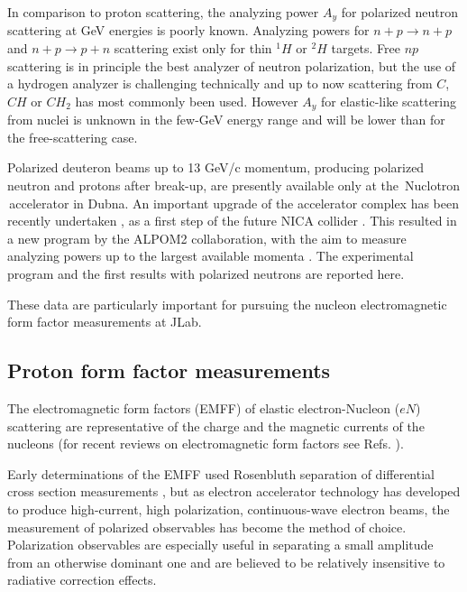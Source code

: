 \documentclass[twocolumn,epjc3]{svjour3}
\begin{document}
In comparison to proton scattering, the analyzing power $A_{y}$ for polarized neutron scattering at GeV energies is poorly known. Analyzing powers for $n+p\to n+p$ and $n+p\to p+n$ scattering exist only for thin $^1H$ or $^2H$ targets.  Free $np$ scattering is in principle the best analyzer of neutron polarization, but the use of a hydrogen analyzer is challenging technically and up to now scattering from $C$, $CH$ or $CH_2$ has most commonly been used. However $A_{y}$ for elastic-like scattering from nuclei is unknown in the few-GeV energy range and will be lower than for the free-scattering case.

Polarized deuteron beams up to 13 GeV/c momentum, producing polarized neutron and protons after break-up, are presently available only at the \,Nuclotron \,accelerator in Dubna. An important upgrade of the accelerator complex has been recently undertaken \cite{Kekelidze:2017ghu}, as a first step of the future NICA collider \cite{Kekelidze:2017ual}. This resulted in a new program by the ALPOM2 collaboration, with the aim to measure analyzing powers up to the largest available momenta \cite{ALPOM2}. The experimental program and the first results with polarized neutrons are reported here.

These data are particularly important for pursuing the nucleon electromagnetic form factor measurements at JLab.

\subsection{Proton form factor measurements}
The electromagnetic form factors (EMFF) of elastic electron-Nucleon ($eN$) scattering are representative of the charge and the magnetic currents of the nucleons (for recent reviews on electromagnetic form factors see Refs. \cite{Pacetti:2015iqa,Punjabi:2015bba}).

Early determinations of the EMFF used Rosenbluth separation of differential cross section measurements \cite{Pacetti:2015iqa}, but as electron accelerator technology has developed to produce high-current, high polarization, continuous-wave electron beams, the measurement of polarized observables has become the method of choice. Polarization observables are especially useful in separating a small amplitude from an otherwise dominant one and are believed to be relatively insensitive to radiative correction effects.
\end{document}
